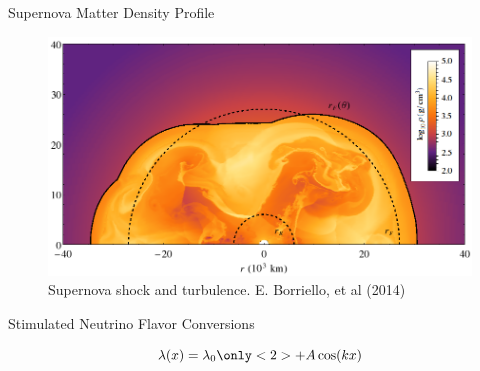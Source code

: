 \documentclass[9pt]{beamer}
\begin{document}
\begin{darkframes}
\begin{frame}{Supernova Matter Density Profile}
\begin{figure}
    \centering
    \includegraphics[height=0.5\textheight]{assets/supernova-shock-turbulence.png}
    \caption*{Supernova shock and turbulence. E. Borriello, et al  (2014)}
\end{figure}



\end{frame}










\begin{frame}{Stimulated Neutrino Flavor Conversions}







\begin{equation*}
    \lambda(x) = \lambda_0\only<2>{ + A \cos(k x )}
\end{equation*}








\end{frame}
\end{darkframes}
\end{document}

